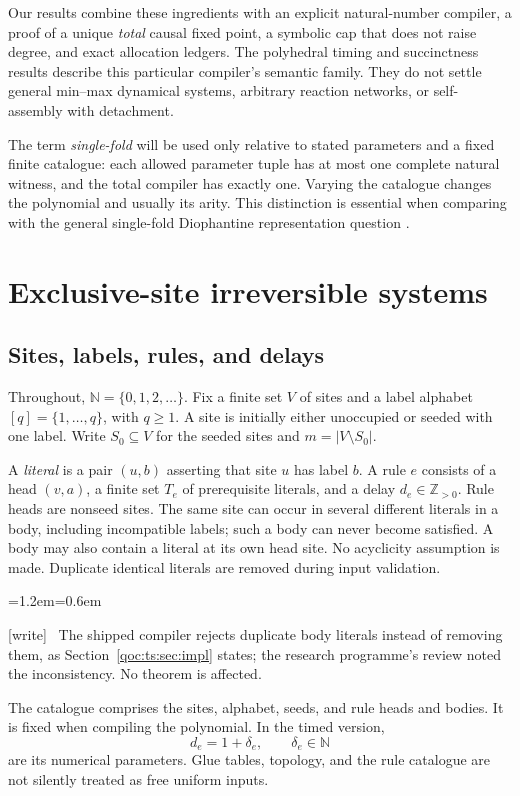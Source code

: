 \documentclass[11pt,letterpaper]{article}
\theoremstyle{definition}
\theoremstyle{remark}
\newcommand{\N}{\mathbb N}
\newcommand{\Z}{\mathbb Z}
\newcommand{\wtag}{\textup{[write]}}
\newenvironment{writenote}{\par\smallskip\begin{list}{}{\leftmargin=1.2em\rightmargin=0.6em}\item[]\small\wtag\ }{\end{list}\smallskip}
\begin{document}
Our results combine these ingredients with an explicit natural-number
compiler, a proof of a unique \emph{total} causal fixed point, a symbolic
cap that does not raise degree, and exact allocation ledgers. The
polyhedral timing and succinctness results describe this particular
compiler's semantic family. They do not settle general min--max dynamical
systems, arbitrary reaction networks, or self-assembly with detachment.

The term \emph{single-fold} will be used only relative to stated parameters
and a fixed finite catalogue: each allowed parameter tuple has at most one
complete natural witness, and the total compiler has exactly one. Varying
the catalogue changes the polynomial and usually its arity. This distinction
is essential when comparing with the general single-fold Diophantine
representation question \cite{ts:matiyasevich}.

\section{Exclusive-site irreversible systems}
\subsection{Sites, labels, rules, and delays}
Throughout, $\N=\{0,1,2,\ldots\}$. Fix a finite set $V$ of sites and a label
alphabet $[q]=\{1,\ldots,q\}$, with $q\ge1$. A site is initially either
unoccupied or seeded with one label. Write $S_0\subseteq V$ for the seeded
sites and $m=|V\setminus S_0|$.

A \emph{literal} is a pair $(u,b)$ asserting that site $u$ has label $b$.
A rule $e$ consists of a head $(v,a)$, a finite set $T_e$ of prerequisite
literals, and a delay $d_e\in\Z_{>0}$. Rule heads are nonseed sites. The
same site can occur in several different literals in a body, including
incompatible labels; such a body can never become satisfied. A body may
also contain a literal at its own head site. No acyclicity assumption is
made. Duplicate identical literals are removed during input validation.

\begin{writenote}
The shipped compiler rejects duplicate body literals instead of removing them, as Section~\ref{qoc:ts:sec:impl} states; the research programme's review noted the inconsistency. No theorem is affected.
\end{writenote}

The catalogue comprises the sites, alphabet, seeds, and rule heads and
bodies. It is fixed when compiling the polynomial. In the timed version,
\begin{equation}\label{qoc:ts:eq:delay}
 d_e=1+\delta_e,\qquad \delta_e\in\N
\end{equation}
are its numerical parameters. Glue tables, topology, and the rule catalogue
are not silently treated as free uniform inputs.
\end{document}
